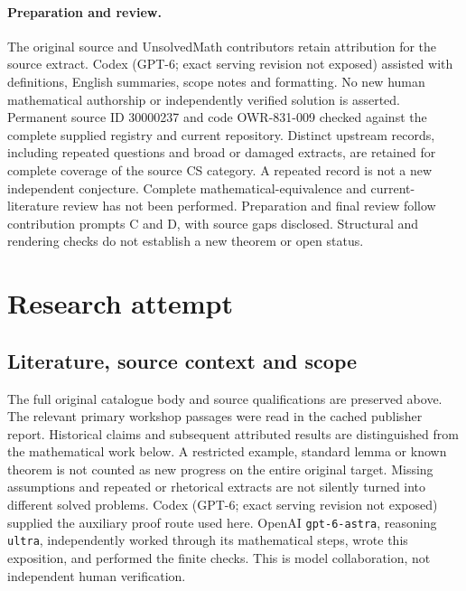 \documentclass[11pt]{article}
\begin{document}
\paragraph{Preparation and review.}
The original source and UnsolvedMath contributors retain attribution for the source extract. Codex (GPT-6; exact serving revision not exposed) assisted with definitions, English summaries, scope notes and formatting. No new human mathematical authorship or independently verified solution is asserted. Permanent source ID 30000237 and code OWR-831-009 checked against the complete supplied registry and current repository. Distinct upstream records, including repeated questions and broad or damaged extracts, are retained for complete coverage of the source CS category. A repeated record is not a new independent conjecture. Complete mathematical-equivalence and current-literature review has not been performed. Preparation and final review follow contribution prompts C and D, with source gaps disclosed. Structural and rendering checks do not establish a new theorem or open status.
\label{end:30000237}

\section{Research attempt}
\subsection{Literature, source context and scope}
The full original catalogue body and source qualifications are preserved above. The relevant primary workshop passages were read in the cached publisher report. Historical claims and subsequent attributed results are distinguished from the mathematical work below. A restricted example, standard lemma or known theorem is not counted as new progress on the entire original target. Missing assumptions and repeated or rhetorical extracts are not silently turned into different solved problems.
Codex (GPT-6; exact serving revision not exposed) supplied the auxiliary proof route used here. OpenAI \texttt{gpt-6-astra}, reasoning \texttt{ultra}, independently worked through its mathematical steps, wrote this exposition, and performed the finite checks. This is model collaboration, not independent human verification.
\end{document}
